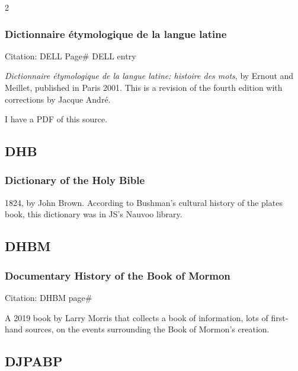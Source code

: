 \begin{multicols}{2}
		\subsubsection*{Dictionnaire étymologique de la langue latine}
		
			Citation:
				DELL Page\#
				DELL entry
		
			\textit{Dictionnaire étymologique de la langue latine: histoire des mots}, by Ernout and Meillet, published in Paris 2001. This is a revision of the fourth edition with corrections by Jacque André.
			
			I have a PDF of this source.
			
	\subsection*{DHB}
	
		\subsubsection*{Dictionary of the Holy Bible}
		
			1824, by John Brown. According to Bushman's cultural history of the plates book, this dictionary was in JS's Nauvoo library.
			
	\subsection*{DHBM}
	
		\subsubsection*{Documentary History of the Book of Mormon}
		
			Citation:
				DHBM page\#
		
			A 2019 book by Larry Morris that collects a book of information, lots of first-hand sources, on the events surrounding the Book of Mormon's creation.
			
	\subsection*{DJPABP}
	

\end{multicols}
